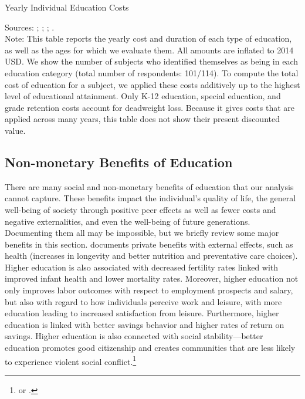 \begin{table}[H]
\caption{Yearly Individual Education Costs} \label{tab:yearlyedu}
\centering
\begin{adjustbox}{max width=\textwidth}
\begin{threeparttable}
\footnotesize

\centering
\begin{tablenotes}%
\scriptsize
\item Sources: \citet{Snyder_Willow_2012_BOOK_NCES}; \citet{Hoenack_Weiler_1975_JHR}; \cite{Dhanidina_Griffith_1975_AEQ}; \cite{Freeman_1974_Occupational-Training_RES}. \\
 Note: This table reports the yearly cost and duration of each type of education, as well as the ages for which we evaluate them.  All amounts are inflated to 2014 USD.
We show the number of subjects who identified themselves as being in each education category (total number of respondents: 101/114). To compute the total cost of education for a subject, we applied these costs additively up to the highest level of educational attainment. Only K-12 education, special  education, and grade retention costs account for deadweight loss. Because it gives costs that are applied across many years, this table does not show their present discounted value.
\end{tablenotes}
\end{threeparttable}
\end{adjustbox}
\end{table}


\subsection{Non-monetary Benefits of Education}

\noindent There are many social and non-monetary benefits of education that our analysis cannot capture. These benefits impact the individual's quality of life, the general well-being of society through positive peer effects as well as fewer costs and negative externalities, and even the well-being of future generations. Documenting them all may be impossible, but we briefly review some major benefits in this section. \cite{Vila_2000_Non-Monetary-Benefits-Education} documents private benefits with external effects, such as health (increases in longevity and better nutrition and preventative care choices). Higher education is also associated with decreased fertility rates linked with improved infant health and lower mortality rates. Moreover, higher education not only improves labor outcomes with respect to employment prospects and salary, but also with regard to how individuals perceive work and leisure, with more education leading to increased satisfaction from leisure. Furthermore, higher education is linked with better savings behavior and higher rates of return on savings. Higher education is also connected with social stability---better education promotes good citizenship and creates communities that are less likely to experience violent social conflict.\footnote{\citet{Lochner_2011_Handbook} or \citet{Lochner_2011_NBER}.} \\